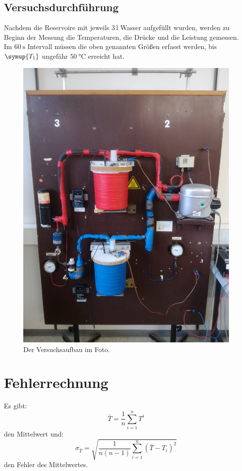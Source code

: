 \subsection{Versuchsdurchführung}
Nachdem die Reservoire mit jeweils 3\,$\si{\litre}$ Wasser aufgefüllt wurden,
werden zu Beginn der Messung  die Temperaturen, die Drücke und die Leistung gemessen.
Im $\SI{60}{\second}$ Intervall müssen die oben genannten Größen erfasst werden, bis
$\symup{T_1}$ ungefähr $\SI{50}{\celsius}$ erreicht hat.
\begin{figure}
  \centering
  \includegraphics[scale=0.07]{foto.jpg}
  \caption{Der Versuchsaufbau im Foto.}
  \label{fig:2}
\end{figure}
\section{Fehlerrechnung}
Es gibt:
\begin{equation}
  \bar{T} = \frac{1}{n} \sum_{i=1}^{n} T^{i}
  \label{eqn:1}
\end{equation}
den Mittelwert und:
\begin{equation}
  \sigma_{\bar{T}} = \sqrt{\frac{1}{n(n-1)} \sum_{i=1}^{n}(\bar{T}-T_i)^2}
  \label{eqn:2}
\end{equation}
den Fehler des Mittelwertes.

